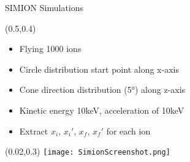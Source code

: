 \documentclass[10pt,aspectratio=169]{beamer}
\begin{document}
\begin{frame}{SIMION Simulations}
    \begin{textblock*}{0.5\paperwidth}(0.5\paperwidth,0.4\paperheight)
        \centering
        \begin{itemize}
            \item Flying 1000 ions
            \item Circle distribution start point along x-axis
            \item Cone direction distribution (5°) along z-axis
            \item Kinetic energy 10keV, acceleration of 10keV
            \item Extract $x_i$, $x_i'$, $x_f$, $x_f'$ for each ion
        \end{itemize}
    \end{textblock*}
    \begin{textblock*}{0.5\paperwidth}(0.02\paperwidth,0.3\paperheight)
			\centering
			\texttt{[image: SimionScreenshot.png]}
		\end{textblock*}
  
\end{frame}
\end{document}
